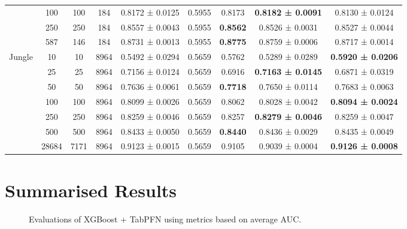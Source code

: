\begin{table}
{\begin{tabular}[H]{@{}lcccccccc@{}}
                              & 100   & 100  & 184  & 0.8172 ± 0.0125      & 0.5955               & 0.8173          & \textbf{0.8182 ± 0.0091} & 0.8130 ± 0.0124          \\
                              & 250   & 250  & 184  & 0.8557 ± 0.0043      & 0.5955               & \textbf{0.8562} & 0.8526 ± 0.0031          & 0.8527 ± 0.0044          \\
                              & 587   & 146  & 184  & 0.8731 ± 0.0013      & 0.5955               & \textbf{0.8775} & 0.8759 ± 0.0006          & 0.8717 ± 0.0014          \\
                              \midrule
\multirow{7}{*}{Jungle}       & 10    & 10   & 8964 & 0.5492 ± 0.0294      & 0.5659               & 0.5762          & 0.5289 ± 0.0289          & \textbf{0.5920 ± 0.0206} \\
                              & 25    & 25   & 8964 & 0.7156 ± 0.0124      & 0.5659               & 0.6916          & \textbf{0.7163 ± 0.0145} & 0.6871 ± 0.0319          \\
                              & 50    & 50   & 8964 & 0.7636 ± 0.0061      & 0.5659               & \textbf{0.7718} & 0.7650 ± 0.0114          & 0.7683 ± 0.0063          \\
                              & 100   & 100  & 8964 & 0.8099 ± 0.0026      & 0.5659               & 0.8062          & 0.8028 ± 0.0042          & \textbf{0.8094 ± 0.0024} \\
                              & 250   & 250  & 8964 & 0.8259 ± 0.0046      & 0.5659               & 0.8257          & \textbf{0.8279 ± 0.0046} & 0.8259 ± 0.0047          \\
                              & 500   & 500  & 8964 & 0.8433 ± 0.0050      & 0.5659               & \textbf{0.8440} & 0.8436 ± 0.0029          & 0.8435 ± 0.0049          \\
                              & 28684 & 7171 & 8964 & 0.9123 ± 0.0015      & 0.5659               & 0.9105          & 0.9039 ± 0.0004          & \textbf{0.9126 ± 0.0008} \\
\bottomrule
\end{tabular}}
\end{table}


\section{Summarised Results}
\label{summary_results}

\begin{figure}[H]
    \centering
    \qquad
    \qquad
    \caption{Evaluations of XGBoost + TabPFN using metrics based on average AUC.}%
    \label{fig:pfn_ap}
\end{figure}

